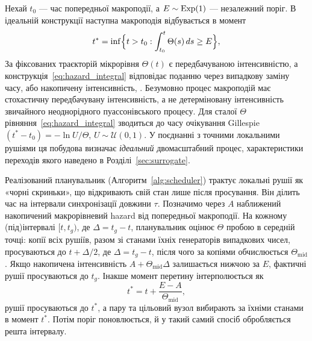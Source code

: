 Нехай $t_0$ --- час попередньої макроподії, а $E\sim\mathrm{Exp}(1)$ --- незалежний поріг. В ідеальній конструкції наступна макроподія відбувається в момент
\begin{equation}
\label{eq:hazard_integral}
t^\ast=\inf\Bigl\{t>t_0:\int_{t_0}^{t}\Theta(s)\,ds\ge E\Bigr\},
\end{equation}
За фіксованих траєкторій мікрорівня $\Theta(t)$ є передбачуваною інтенсивністю, а конструкція~\eqref{eq:hazard_integral} відповідає поданню через випадкову заміну часу, або накопичену інтенсивність, \citep{ethier1986,anderson2007}. Безумовно процес макроподій має стохастичну передбачувану інтенсивність, а не детерміновану інтенсивність звичайного неоднорідного пуассонівського процесу. Для сталої $\Theta$ рівняння~\eqref{eq:hazard_integral} зводиться до часу очікування Gillespie $(t^\ast-t_0)=-\ln U/\Theta$, $U\sim\mathcal{U}(0,1)$. У поєднанні з точними локальними рушіями ця побудова визначає \emph{ідеальний} двомасштабний процес, характеристики переходів якого наведено в Розділі~\ref{sec:surrogate}.

Реалізований планувальник (Алгоритм~\ref{alg:scheduler}) трактує локальні рушії як «чорні скриньки», що відкривають свій стан лише після просування. Він ділить час на інтервали синхронізації довжини $\tau$. Позначимо через $A$ наближений накопичений макрорівневий hazard від попередньої макроподії. На кожному (під)інтервалі $[t,t_g)$, де $\Delta=t_g-t$, планувальник оцінює $\Theta$ пробою в середній точці: копії всіх рушіїв, разом зі станами їхніх генераторів випадкових чисел, просуваються до $t+\Delta/2$, де $\Delta=t_g-t$, після чого за копіями обчислюється $\Theta_{\mathrm{mid}}$. Якщо накопичена інтенсивність $A+\Theta_{\mathrm{mid}}\Delta$ залишається нижчою за $E$, фактичні рушії просуваються до $t_g$. Інакше момент перетину інтерполюється як
\begin{equation}
\label{eq:interpolation}
t^\ast=t+\frac{E-A}{\Theta_{\mathrm{mid}}},
\end{equation}
рушії просуваються до $t^\ast$, а пару та цільовий вузол вибирають за їхніми станами в момент $t^\ast$. Потім поріг поновлюється, й у такий самий спосіб обробляється решта інтервалу.

